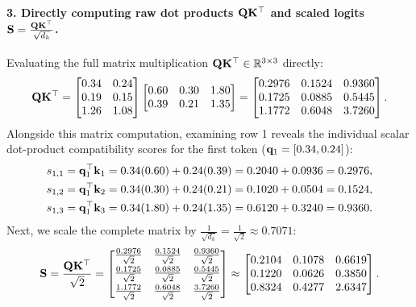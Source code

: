 \documentclass[../../main.tex]{subfiles}
\begin{document}
\paragraph{3. Directly computing raw dot products $\mathbf{Q}\mathbf{K}^\top$ and scaled logits $\mathbf{S} = \frac{\mathbf{Q}\mathbf{K}^\top}{\sqrt{d_k}}$.}
Evaluating the full matrix multiplication $\mathbf{Q} \mathbf{K}^\top \in \mathbb{R}^{3 \times 3}$ directly:
\begin{equation}
\mathbf{Q} \mathbf{K}^\top = \begin{bmatrix}
0.34 & 0.24 \\
0.19 & 0.15 \\
1.26 & 1.08
\end{bmatrix}
\begin{bmatrix}
0.60 & 0.30 & 1.80 \\
0.39 & 0.21 & 1.35
\end{bmatrix}
= \begin{bmatrix}
0.2976 & 0.1524 & 0.9360 \\
0.1725 & 0.0885 & 0.5445 \\
1.1772 & 0.6048 & 3.7260
\end{bmatrix}.
\end{equation}
Alongside this matrix computation, examining row 1 reveals the individual scalar dot-product compatibility scores for the first token ($\mathbf{q}_1 = [0.34, 0.24]$):
\begin{align}
s_{1,1} &= \mathbf{q}_1^\top \mathbf{k}_1 = 0.34(0.60) + 0.24(0.39) = 0.2040 + 0.0936 = 0.2976, \\
s_{1,2} &= \mathbf{q}_1^\top \mathbf{k}_2 = 0.34(0.30) + 0.24(0.21) = 0.1020 + 0.0504 = 0.1524, \\
s_{1,3} &= \mathbf{q}_1^\top \mathbf{k}_3 = 0.34(1.80) + 0.24(1.35) = 0.6120 + 0.3240 = 0.9360.
\end{align}
Next, we scale the complete matrix by $\frac{1}{\sqrt{d_k}} = \frac{1}{\sqrt{2}} \approx 0.7071$:
\begin{equation}
\label{eq:matrix_scaled_scores_numerical}
\mathbf{S} = \frac{\mathbf{Q} \mathbf{K}^\top}{\sqrt{2}} = \begin{bmatrix}
\frac{0.2976}{\sqrt{2}} & \frac{0.1524}{\sqrt{2}} & \frac{0.9360}{\sqrt{2}} \\[4pt]
\frac{0.1725}{\sqrt{2}} & \frac{0.0885}{\sqrt{2}} & \frac{0.5445}{\sqrt{2}} \\[4pt]
\frac{1.1772}{\sqrt{2}} & \frac{0.6048}{\sqrt{2}} & \frac{3.7260}{\sqrt{2}}
\end{bmatrix}
\approx \begin{bmatrix}
0.2104 & 0.1078 & 0.6619 \\
0.1220 & 0.0626 & 0.3850 \\
0.8324 & 0.4277 & 2.6347
\end{bmatrix}.
\end{equation}
\end{document}
